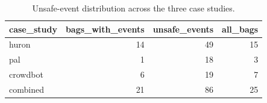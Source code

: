 \begin{table}[tbp]
\caption{Unsafe-event distribution across the three case studies.}
\label{tab:rq4-event-distribution}
\begin{tabular}{lrrr}
\toprule
case\_study & bags\_with\_events & unsafe\_events & all\_bags \\
\midrule
huron & 14 & 49 & 15 \\
pal & 1 & 18 & 3 \\
crowdbot & 6 & 19 & 7 \\
combined & 21 & 86 & 25 \\
\bottomrule
\end{tabular}
\end{table}
